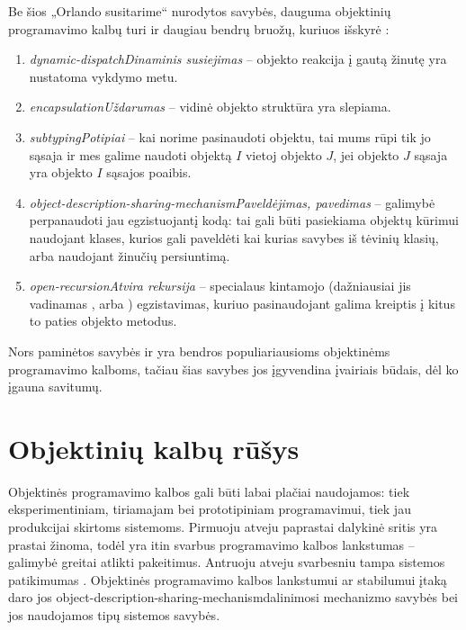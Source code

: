 Be šios „Orlando susitarime“ nurodytos savybės, dauguma
objektinių programavimo kalbų turi ir daugiau bendrų bruožų,
kuriuos išskyrė \cite[225-227]{types-and-programming-languages}:
\begin{enumerate}
  \item \emph{\gls{dynamic-dispatch}{Dinaminis susiejimas}} –
    objekto reakcija į gautą žinutę yra nustatoma vykdymo metu.
  \item \emph{\gls{encapsulation}{Uždarumas}} – vidinė objekto
    struktūra yra slepiama.
  \item \emph{\gls{subtyping}{Potipiai}} – kai norime pasinaudoti objektu, 
    tai mums rūpi tik jo sąsaja ir mes galime naudoti objektą $I$ vietoj
    objekto $J$, jei objekto $J$ sąsaja yra objekto $I$ sąsajos poaibis.
  \item \emph{\gls{object-description-sharing-mechanism}{Paveldėjimas,
    pavedimas}} – galimybė perpanaudoti jau egzistuojantį kodą: tai
    gali būti pasiekiama objektų kūrimui naudojant klases, kurios
    gali paveldėti kai kurias savybes iš tėvinių klasių, arba
    naudojant žinučių persiuntimą.
  \item \emph{\gls{open-recursion}{Atvira rekursija}} – specialaus
    kintamojo (dažniausiai jis vadinamas , arba
    ) egzistavimas, kuriuo pasinaudojant galima kreiptis
    į kitus to paties objekto metodus.
\end{enumerate}
Nors paminėtos savybės ir yra bendros populiariausioms objektinėms
programavimo kalboms, tačiau šias savybes jos įgyvendina įvairiais
būdais, dėl ko įgauna savitumų.

\section{Objektinių kalbų rūšys}

Objektinės programavimo kalbos gali būti labai plačiai naudojamos:
tiek eksperimentiniam, tiriamajam bei prototipiniam programavimui, tiek
jau produkcijai skirtoms sistemoms. Pirmuoju atveju paprastai dalykinė
sritis yra prastai žinoma, todėl yra itin svarbus programavimo kalbos
lankstumas – galimybė greitai atlikti pakeitimus. Antruoju atveju
svarbesniu tampa sistemos patikimumas
\cite{Lieberman:1987:TO:62139.62144}. Objektinės programavimo kalbos
lankstumui ar stabilumui įtaką daro jos
\gls{object-description-sharing-mechanism}{dalinimosi mechanizmo}
savybės \cite{Lieberman:1987:TO:62139.62144} bei jos naudojamos
tipų sistemos savybės.

